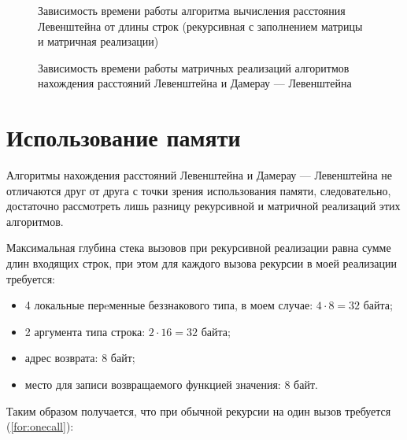 \documentclass[a4paper,14pt, unknownkeysallowed]{extreport}
\begin{document}
\begin{figure}[h]
	\centering
	\captionsetup{justification=centering}
	\caption{Зависимость времени работы алгоритма вычисления расстояния Левенштейна от длины строк (рекурсивная с заполнением матрицы и матричная реализации)}
	\label{plt:time_levenshtein}
\end{figure}

\begin{figure}[h]
	\centering
	\captionsetup{justification=centering}
	\caption{Зависимость времени работы матричных реализаций алгоритмов нахождения расстояний Левенштейна и Дамерау — Левенштейна}
	\label{plt:time_dl}
\end{figure}


\section{Использование памяти}

Алгоритмы нахождения расстояний Левенштейна и Дамерау — Левенштейна не отличаются друг от друга с точки зрения использования памяти, следовательно, достаточно рассмотреть лишь разницу рекурсивной и матричной реализаций этих алгоритмов.

Максимальная глубина стека вызовов при рекурсивной реализации равна сумме длин входящих строк, при этом для каждого вызова рекурсии в моей реализации требуется:
\begin{itemize}
    \item 4 локальные перeменные беззнакового типа, в моем случае: $4 \cdot 8 = 32$ байта;
    \item 2 аргумента типа строка: $2 \cdot 16 = 32$ байта;
    \item адрес возврата: 8 байт;
    \item место для записи возвращаемого функцией значения: 8 байт.
\end{itemize}
Таким образом получается, что при обычной рекурсии на один вызов требуется (\ref{for:onecall}): 
\end{document}
